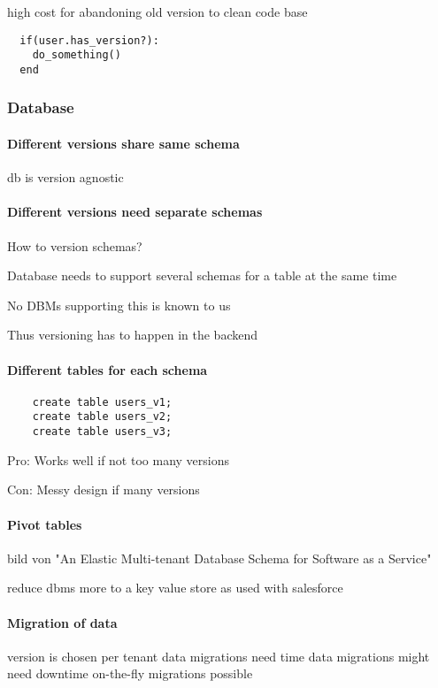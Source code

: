 high cost for abandoning old version to clean code base

\lstset{language=Ruby, caption=code snippet, label=code}
\begin{lstlisting}
  if(user.has_version?):
    do_something()
  end
\end{lstlisting}

\subsubsection{Database}

\paragraph{Different versions share same schema}
db is version agnostic

\paragraph{Different versions need separate schemas}
How to version schemas?

  Database needs to support several schemas for a table at the same time

  No DBMs supporting this is known to us

  Thus versioning has to happen in the backend

  \paragraph{Different tables for each schema}
  \lstset{language=SQL, caption=sql, label=sql}
  \begin{lstlisting}
    create table users_v1;
    create table users_v2;
    create table users_v3;
  \end{lstlisting}

  Pro:
  Works well if not too many versions

  Con:
  Messy design if many versions


  \paragraph{Pivot tables}

  bild von "An Elastic Multi-tenant Database Schema for Software as a Service"

  reduce dbms more to a key value store
  as used with salesforce

\paragraph{Migration of data}
  version is chosen per tenant
  data migrations need time
  data migrations might need downtime
  on-the-fly migrations possible

